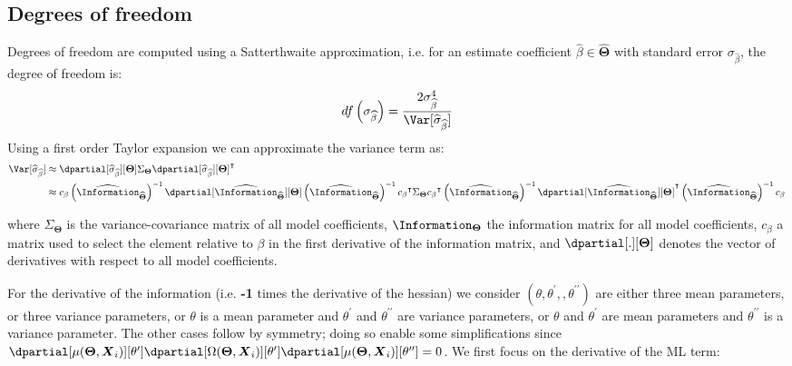 \documentclass[12pt]{article}
\newcommand\trans[1]{{#1}^\intercal}%
\newcommand{\param}{\Theta}
\newcommand{\Vparam}{\boldsymbol{\param}}
\newcommand{\VX}{\boldsymbol{X}}
\begin{document}
\clearpage
\subsection{Degrees of freedom}
\label{sec:org61cd2e2}

Degrees of freedom are computed using a Satterthwaite approximation,
i.e. for an estimate coefficient \(\widehat{\beta}\in\widehat{\Vparam}\) with standard
error \(\sigma_{\widehat{\beta}}\), the degree of freedom is:
\begin{align*}
df\left(\sigma_{\widehat{\beta}}\right) = \frac{2 \sigma^4_{\widehat{\beta}}}{\Var[\widehat{\sigma}_{\widehat{\beta}}]}
\end{align*}
Using a first order Taylor expansion we can approximate the variance term as:
\begin{align*}
\Var[\widehat{\sigma}_{\widehat{\beta}}] & \approx \dpartial[\widehat{\sigma}_{\widehat{\beta}}][\Vparam] \Sigma_{\Vparam}  \trans{\dpartial[\widehat{\sigma}_{\widehat{\beta}}][\Vparam]} \\
& \approx c_{\beta} \left(\widehat{\Information}_{\widehat{\Vparam}}\right)^{-1} \dpartial[\widehat{\Information}_{\widehat{\Vparam}}][\Vparam] \left(\widehat{\Information}_{\widehat{\Vparam}}\right)^{-1} \trans{c_{\beta}} \Sigma_{\Vparam} \trans{c_{\beta}} \left(\widehat{\Information}_{\widehat{\Vparam}}\right)^{-1} \trans{\dpartial[\widehat{\Information}_{\widehat{\Vparam}}][\Vparam]} \left(\widehat{\Information}_{\widehat{\Vparam}}\right)^{-1} c_{\beta}
\end{align*}

where \(\Sigma_{\Vparam}\) is the variance-covariance matrix of all
  model coefficients, \(\Information_{\Vparam}\) the information
  matrix for all model coefficients, \(c_{\beta}\) a matrix used to
  select the element relative to \(\beta\) in the first derivative of
  the information matrix, and \(\dpartial[.][\Vparam]\) denotes the
  vector of derivatives with respect to all model coefficients.

\bigskip

For the derivative of the information (i.e. \textbf{-1} times the derivative
 of the hessian) we consider
 \((\theta,\theta^{\prime},,\theta^{\prime\prime})\) are either three
 mean parameters, or three variance parameters, or \(\theta\) is a
 mean parameter and \(\theta^{\prime}\) and \(\theta^{\prime\prime}\)
 are variance parameters, or \(\theta\) and \(\theta^{\prime}\) are
 mean parameters and \(\theta^{\prime\prime}\) is a variance
 parameter. The other cases follow by symmetry; doing so enable some
 simplifications since
 \(\dpartial[\mu(\Vparam,\VX_i)][\theta^{\prime}]\dpartial[\Omega(\Vparam,\VX_i)][\theta^{\prime}]\dpartial[\mu(\Vparam,\VX_i)][\theta^{\prime\prime}]=0\). We
 first focus on the derivative of the ML term:
\end{document}
